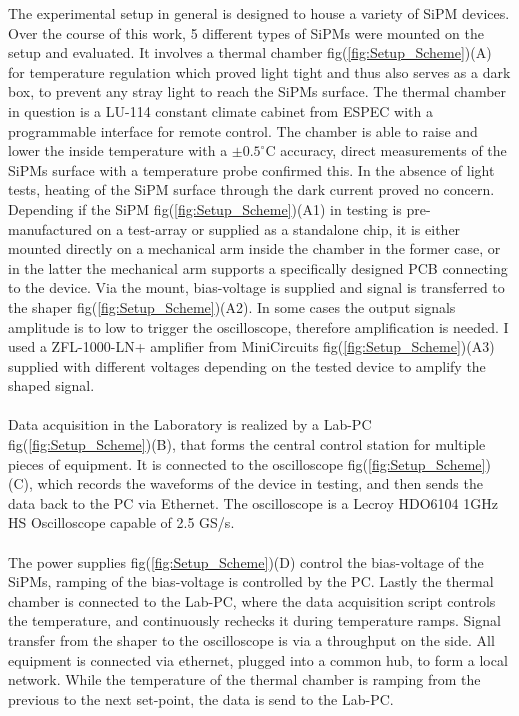 \documentclass[12pt,article,type=msc,colorback,accentcolor=tud9c]{tudthesis}
\begin{document}
The experimental setup in general is designed to house a variety of SiPM devices. Over the course of this work, 5 different types of SiPMs were mounted on the setup and evaluated. It involves a thermal chamber fig(\ref{fig:Setup_Scheme})(A) for temperature regulation which proved light tight and thus also serves as a dark box, to prevent any stray light to reach the SiPMs surface. The thermal chamber in question is a LU-114 constant climate cabinet from ESPEC with a programmable interface for remote control. The chamber is able to raise and lower the inside temperature with a $\pm0.5^\circ$C accuracy, direct measurements of the SiPMs surface with a temperature probe confirmed this. In the absence of light tests, heating of the SiPM surface through the dark current proved no concern.\\ Depending if the SiPM fig(\ref{fig:Setup_Scheme})(A1) in testing is pre-manufactured on a test-array or supplied as a standalone chip, it is either mounted directly on a mechanical arm inside the chamber in the former case, or in the latter the mechanical arm supports a specifically designed PCB connecting to the device. Via the mount, bias-voltage is supplied and signal is transferred to the shaper fig(\ref{fig:Setup_Scheme})(A2). In some cases the output signals amplitude is to low to trigger the oscilloscope, therefore amplification is needed. I used a ZFL-1000-LN+ amplifier from MiniCircuits fig(\ref{fig:Setup_Scheme})(A3) supplied with different voltages depending on the tested device to amplify the shaped signal.\\\\
Data acquisition in the Laboratory is realized by a Lab-PC fig(\ref{fig:Setup_Scheme})(B), that forms the central control station for multiple pieces of equipment. It is connected to the oscilloscope fig(\ref{fig:Setup_Scheme})(C), which records the waveforms of the device in testing, and then sends the data back to the PC via Ethernet. The oscilloscope is a Lecroy HDO6104 1GHz HS Oscilloscope capable of 2.5 GS/s.\\\\ The power supplies fig(\ref{fig:Setup_Scheme})(D) control the bias-voltage of the SiPMs, ramping of the bias-voltage is controlled by the PC. Lastly the thermal chamber is connected to the Lab-PC, where the data acquisition script controls the temperature, and continuously rechecks it during temperature ramps. Signal transfer from the shaper to the oscilloscope is via a throughput on the side. All equipment is connected via ethernet, plugged into a common hub, to form a local network. While the temperature of the thermal chamber is ramping from the previous to the next set-point, the data is send to the Lab-PC.\\\\
\end{document}
